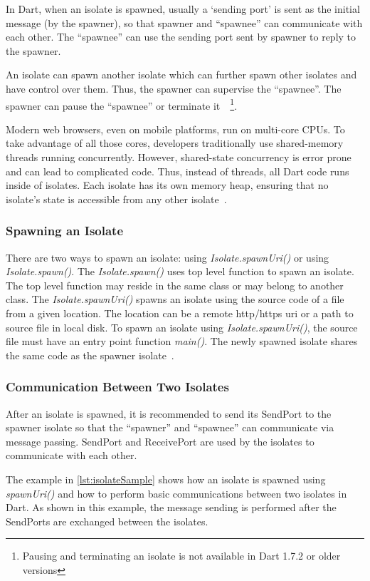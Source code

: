   In Dart, when an isolate is spawned, usually a ‘sending port’ is sent as the initial message (by the spawner), so that spawner and “spawnee” can communicate with each other. The “spawnee” can use the sending port sent by spawner to reply to the spawner.

  An isolate can spawn another isolate which can further spawn other isolates and have control over them. Thus, the spawner can supervise the “spawnee”. The spawner can pause the “spawnee” or terminate it~\cite{dartApiIsolate}~\footnote{Pausing and terminating an isolate is not available in Dart 1.7.2 or older versions}.

  Modern web browsers, even on mobile platforms, run on multi-core CPUs. To take advantage of all those cores, developers traditionally use shared-memory threads running concurrently. However, shared-state concurrency is error prone and can lead to complicated code. Thus, instead of threads, all Dart code runs inside of isolates. Each isolate has its own memory heap, ensuring that no isolate’s state is accessible from any other isolate~\parencite{laddWalrath}.

  \subsubsection{Spawning an Isolate}
    There are two ways to spawn an isolate: using \emph{Isolate.spawnUri()} or using \emph{Isolate.spawn()}. The \emph{Isolate.spawn()} uses top level function to spawn an isolate. The top level function may reside in the same class or may belong to another class. The \emph{Isolate.spawnUri()} spawns an isolate using the source code of a file from a given location. The location can be a remote http/https \acrshort{uri} or a path to source file in local disk. To spawn an isolate using \emph{Isolate.spawnUri()}, the source file must have an entry point function \emph{main()}.
    The newly spawned isolate shares the same code as the spawner isolate~\cite{dartApiIsolate}.

  \subsubsection{Communication Between Two Isolates}
  After an isolate is spawned, it is recommended to send its SendPort to the spawner isolate so that the “spawner” and “spawnee” can communicate via message passing. SendPort and ReceivePort are used by the isolates to communicate with each other.

  The example in \autoref{lst:isolateSample} shows how an isolate is spawned using \emph{spawnUri()} and how to perform basic communications between two isolates in Dart. As shown in this example, the message sending is performed after the SendPorts are exchanged between the isolates.

